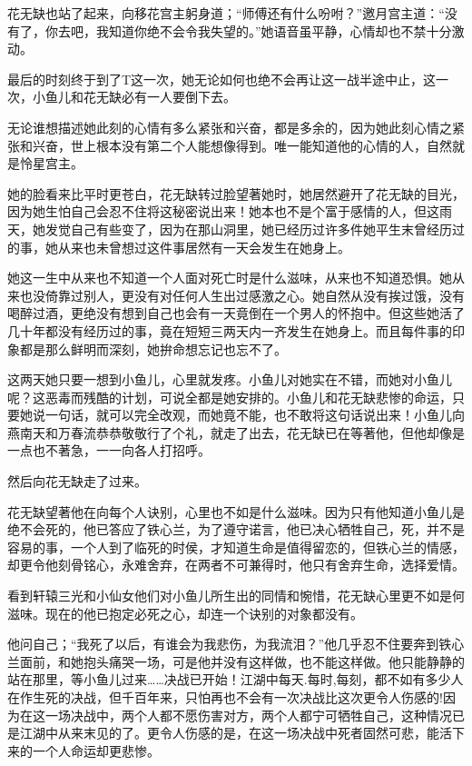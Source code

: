 \documentclass[12pt,oneside]{book}
\begin{document}
花无缺也站了起来，向移花宫主躬身道；``师傅还有什么吩咐？''邀月宫主道：``没有了，你去吧，我知道你绝不会令我失望的。''她语音虽平静，心情却也不禁十分激动。

最后的时刻终于到了T这一次，她无论如何也绝不会再让这一战半途中止，这一次，小鱼儿和花无缺必有一人要倒下去。

无论谁想描述她此刻的心情有多么紧张和兴奋，都是多余的，因为她此刻心情之紧张和兴奋，世上根本没有第二个人能想像得到。唯一能知道他的心情的人，自然就是怜星宫主。

她的脸看来比平时更苍白，花无缺转过脸望著她时，她居然避开了花无缺的目光，因为她生怕自己会忍不住将这秘密说出来！她本也不是个富于感情的人，但这雨天，她发觉自己有些变了，因为在那山洞里，她已经历过许多件她平生末曾经历过的事，她从来也未曾想过这件事居然有一天会发生在她身上。

她这一生中从来也不知道一个人面对死亡时是什么滋味，从来也不知道恐惧。她从来也没倚靠过别人，更没有对任何人生出过感激之心。她自然从没有挨过饿，没有喝醉过酒，更绝没有想到自己也会有一天竟倒在一个男人的怀抱中。但这些她活了几十年都没有经历过的事，竟在短短三两天内一齐发生在她身上。而且每件事的印象都是那么鲜明而深刻，她拚命想忘记也忘不了。

这两天她只要一想到小鱼儿，心里就发疼。小鱼儿对她实在不错，而她对小鱼儿呢？这恶毒而残酷的计划，可说全都是她安排的。小鱼儿和花无缺悲惨的命运，只要她说一句话，就可以完全改观，而她竟不能，也不敢将这句话说出来！小鱼儿向燕南天和万春流恭恭敬敬行了个礼，就走了出去，花无缺已在等著他，但他却像是一点也不著急，一一向各人打招呼。

然后向花无缺走了过来。

花无缺望著他在向每个人诀别，心里也不如是什么滋味。因为只有他知道小鱼儿是绝不会死的，他已答应了铁心兰，为了遵守诺言，他已决心牺牲自己，死，并不是容易的事，一个人到了临死的时侯，才知道生命是值得留恋的，但铁心兰的情感，却更令他刻骨铭心，永难舍弃，在两者不可兼得时，他只有舍弃生命，选择爱情。

看到轩辕三光和小仙女他们对小鱼儿所生出的同情和惋惜，花无缺心里更不如是何滋味。现在的他已抱定必死之心，却连一个诀别的对象都没有。

他问自己；``我死了以后，有谁会为我悲伤，为我流泪？''他几乎忍不住要奔到铁心兰面前，和她抱头痛哭一场，可是他并没有这样做，也不能这样做。他只能静静的站在那里，等小鱼儿过来\ldots\ldots 决战已开始！江湖中每天.每时,每刻，都不如有多少人在作生死的决战，但千百年来，只怕再也不会有一次决战比这次更令人伤感的!因为在这一场决战中，两个人都不愿伤害对方，两个人都宁可牺牲自己，这种情况已是江湖中从来末见的了。更令人伤感的是，在这一场决战中死者固然可悲，能活下来的一个人命运却更悲惨。
\end{document}
